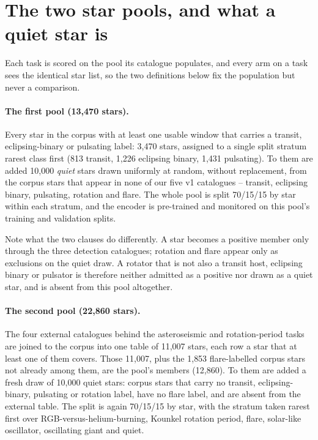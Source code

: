\documentclass{article}
\begin{document}
\section{The two star pools, and what a quiet star is}
\label{app:pools}

Each task is scored on the pool its catalogue populates, and every arm on a task sees the identical
star list, so the two definitions below fix the population but never a comparison.

\paragraph{The first pool (13{,}470 stars).} Every star in the corpus with at least one usable window
that carries a transit, eclipsing-binary or pulsating label: 3{,}470 stars, assigned to a single
split stratum rarest class first (813 transit, 1{,}226 eclipsing binary, 1{,}431 pulsating). To them
are added 10{,}000 \emph{quiet} stars drawn uniformly at random, without replacement, from the corpus
stars that appear in none of our five v1 catalogues -- transit, eclipsing binary, pulsating, rotation
and flare. The whole pool is split 70/15/15 by star within each stratum, and the encoder is
pre-trained and monitored on this pool's training and validation splits.

Note what the two clauses do differently. A star becomes a positive member only through the three
detection catalogues; rotation and flare appear only as exclusions on the quiet draw. A rotator that
is not also a transit host, eclipsing binary or pulsator is therefore neither admitted as a positive
nor drawn as a quiet star, and is absent from this pool altogether.

\paragraph{The second pool (22{,}860 stars).} The four external catalogues behind the asteroseismic
and rotation-period tasks are joined to the corpus into one table of 11{,}007 stars, each row a star
that at least one of them covers. Those 11{,}007, plus the 1{,}853 flare-labelled corpus stars not
already among them, are the pool's members (12{,}860). To them are added a fresh draw of 10{,}000
quiet stars: corpus stars that carry no transit, eclipsing-binary, pulsating or rotation label, have
no flare label, and are absent from the external table. The split is again 70/15/15 by star, with the
stratum taken rarest first over RGB-versus-helium-burning, Kounkel rotation period, flare, solar-like
oscillator, oscillating giant and quiet.
\end{document}
